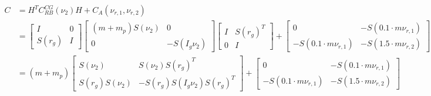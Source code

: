 \documentclass[12pt,a4]{article}
\begin{document}
\begin{align*}
	C & = H^T C_{RB}^{CG}(\nu_2) H  + C_A(\nu_{r,1},\nu_{r,2}) \\
	  & =
	\begin{bmatrix} I & 0 \\ S(r_g)  & I \end{bmatrix}
	\begin{bmatrix}
		(m+m_p) S(\nu_2) & 0             \\
		0                & -S(I_g \nu_2)
	\end{bmatrix}
	\begin{bmatrix} I & S(r_g)^T\\ 0  & I \end{bmatrix}
	+
	\begin{bmatrix}
		0                        & -S(0.1 \cdot m\nu_{r,1}) \\
		-S(0.1 \cdot m\nu_{r,1}) & -S(1.5 \cdot m\nu_{r,2})
	\end{bmatrix}                                 \\
	  & =
	(m+m_p)
	\begin{bmatrix}
		S(\nu_2)        & S(\nu_2)  S(r_g)^T          \\
		S(r_g) S(\nu_2) & -S(r_g)S(I_g \nu_2)S(r_g)^T
	\end{bmatrix}
	+
	\begin{bmatrix}
		0                        & -S(0.1 \cdot m\nu_{r,1}) \\
		-S(0.1 \cdot m\nu_{r,1}) & -S(1.5 \cdot m\nu_{r,2})
	\end{bmatrix}
\end{align*}
\end{document}

